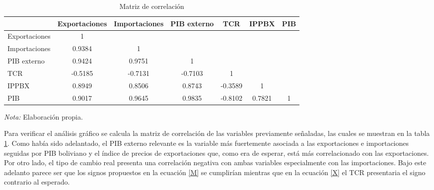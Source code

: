 \documentclass[12pt,letterpaper]{article}
\begin{document}
\begin{table}
\caption{Matriz de correlación}
\begin{center}
\begin{tabular}{lcccccc}									
\hline													
\hline												
	&	Exportaciones	&	Importaciones	&	PIB externo	&	TCR	&	IPPBX	&	PIB	\\
\hline													
Exportaciones	&	1	&		&		&		&		&		\\
Importaciones	&	0.9384	&	1	&		&		&		&		\\
PIB externo	&	0.9424	&	0.9751	&	1	&		&		&		\\
TCR	&	-0.5185	&	-0.7131	&	-0.7103	&	1	&		&		\\
IPPBX	&	0.8949	&	0.8506	&	0.8743	&	-0.3589	&	1	&		\\
PIB	&	0.9017	&	0.9645	&	0.9835	&	-0.8102	&	0.7821	&	1	\\
\hline													
\hline									
\end{tabular}	
\end{center}						
\begin{scriptsize}
\emph{Nota:} Elaboración propia.
\end{scriptsize}	
\label{corre}	
\end{table}	

Para verificar el análisis gráfico se calcula la matriz de correlación de las variables previamente señaladas, las cuales se muestran en la tabla \ref{corre}. Como había sido adelantado, el PIB externo relevante es la variable más fuertemente asociada a las exportaciones e importaciones seguidas por PIB boliviano y el índice de precios de exportaciones que, como era de esperar, está más correlacionado con las exportaciones. Por otro lado, el tipo de cambio real presenta una correlación negativa con ambas variables especialmente con las importaciones. Bajo este adelanto parece ser que los signos propuestos en la ecuación \ref{M} se cumplirían mientras que en la ecuación \ref{X} el TCR presentaria el signo contrario al esperado.
\end{document}
